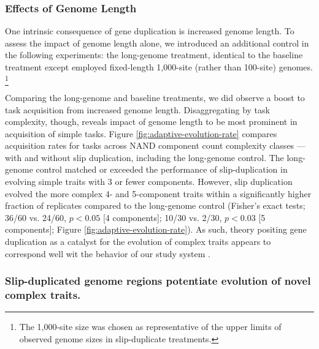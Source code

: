 \subsubsection{Effects of Genome Length}



One intrinsic consequence of gene duplication is increased genome length.
To assess the impact of genome length alone, we introduced an additional control in the following experiments: the long-genome treatment, identical to the baseline treatment except employed fixed-length 1,000-site (rather than 100-site) genomes.%
\footnote{%
The 1,000-site size was chosen as representative of the upper limits of observed genome sizes in slip-duplicate treatments.
}

Comparing the long-genome and baseline treatments, we did observe a boost to task acquisition from increased genome length.
Disaggregating by task complexity, though, reveals impact of genome length to be most prominent in acquisition of simple tasks.
Figure \ref{fig:adaptive-evolution-rate} compares acquisition rates for tasks across NAND component count complexity classes --- with and without slip duplication, including the long-genome control.
The long-genome control matched or exceeded the performance of slip-duplication in evolving simple traits with 3 or fewer components.
However, slip duplication evolved the more complex 4- and 5-component traits within a significantly higher fraction of replicates compared to the long-genome control (Fisher's exact tests; 36/60 vs. 24/60, $p<0.05$ [4 components]; 10/30 vs. 2/30, $p<0.03$ [5 components]; Figure \ref{fig:adaptive-evolution-rate}).
As such, theory positing gene duplication as a catalyst for the evolution of complex traits appears to correspond well wit the  behavior of our study system \citep{ohno1970evolution}.

\subsubsection{Slip-duplicated genome regions potentiate evolution of novel complex traits.}

